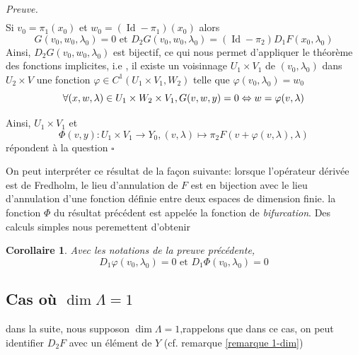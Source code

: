 \documentclass[a4paper,12pt,oneside,titlepage]{article}
\theoremstyle{definition}
\theoremstyle{plain}
\newtheorem{corollaire}[definition]{Corollaire}
\newenvironment{preuve}
{\par\noindent\textit{Preuve.}\ }
{\hfill$\square$\par}
\begin{document}
\begin{preuve}
\begin{eqnarray*}
\end{eqnarray*}
Si $v_0=\pi_1(x_0)$ et $w_0=(\operatorname{Id}-\pi_1)(x_0)$ alors
\begin{equation*}
    G(v_0,w_0,\lambda_0)=0\text{ et } D_2G(v_0,w_0,\lambda_0)= (\operatorname*{Id}-\pi_2) D_1  F (x_0,\lambda_0)
\end{equation*}
Ainsi,  $D_2G(v_0,w_0,\lambda_0)$ est bijectif, ce qui nous permet d'appliquer le théorème des fonctions implicites, i.e , il existe un voisinnage $U_1\times V_1$ de $(v_0,\lambda_0)$ dans $U_2\times V$ une fonction $\varphi\in C^1(U_1\times V_1,W_2)$ telle que $\varphi(v_0,\lambda_0)=w_0$
\begin{equation*}
    \forall (x,w,\lambda)\in U_1\times W_2\times V_1,\space G(v,w,y)=0\Leftrightarrow w = \varphi(v,\lambda)
\end{equation*}

Ainsi, $U_1\times V_1$ et 
\begin{equation}\label{fonctionproj}
    \Phi(v,y): U_1\times V_1\rightarrow Y_0, (v,\lambda)\mapsto \pi_2 F(v+\varphi(v,\lambda),\lambda)
\end{equation}
répondent à la question
\end{preuve}
On peut interpréter ce résultat de la façon suivante: lorsque l'opérateur dérivée est de Fredholm, le lieu d'annulation de $F$ est en bijection avec le lieu d'annulation d'une fonction définie entre deux espaces de dimension finie. la fonction $\Phi$ du résultat précédent est appelée la fonction de \textit{bifurcation}.
Des calculs simples nous peremettent d'obtenir
\begin{corollaire}\label{corr-deriv-o}
    Avec les notations de la preuve précédente, 
    \begin{equation*}
        D_1\varphi(v_0,\lambda_0)=0\text{ et }    D_1\Phi(v_0,\lambda_0)=0
    \end{equation*}
\end{corollaire}




\subsection{Cas où $\dim \Lambda=1$}
dans la suite, nous supposon $\dim \Lambda = 1$,rappelons que dans ce cas, on peut identifier $D_2F$ avec un élément de $Y$ (cf. remarque \ref{remarque 1-dim})
\end{document}
